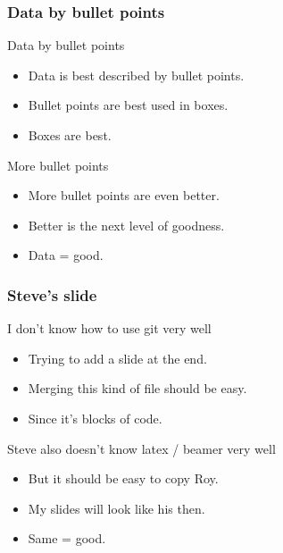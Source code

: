 \documentclass[11pt,xcolor=table]{beamer}
\begin{document}

\begin{frame}
\frametitle{Data by bullet points}
\begin{center}

\begin{block}{Data by bullet points}
\begin{itemize}
	\item Data is best described by bullet points.
	\item Bullet points are best used in boxes.
	\item Boxes are best.
\end{itemize}
\end{block}

\begin{exampleblock}{More bullet points}
\begin{itemize}
	\item More bullet points are even better.
	\item Better is the next level of goodness.
	\item Data = good.
\end{itemize}
\end{exampleblock}

\end{center}
\end{frame}


\begin{frame}
\frametitle{Steve's slide}
\begin{center}

\begin{block}{I don't know how to use git very well}
\begin{itemize}
	\item Trying to add a slide at the end.
	\item Merging this kind of file should be easy.
	\item Since it's blocks of code.
\end{itemize}
\end{block}

\begin{exampleblock}{Steve also doesn't know latex / beamer very well}
\begin{itemize}
	\item But it should be easy to copy Roy.
	\item My slides will look like his then.
	\item Same = good.
\end{itemize}
\end{exampleblock}

\end{center}
\end{frame}

\end{document}
